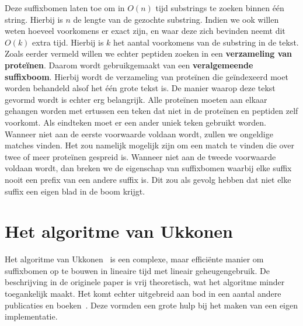 Deze suffixbomen laten toe om in $O(n)$ tijd substrings te zoeken binnen één string.
Hierbij is $n$ de lengte van de gezochte substring.
Indien we ook willen weten hoeveel voorkomens er exact zijn, en waar deze zich bevinden neemt dit $O(k)$ extra tijd.
Hierbij is $k$ het aantal voorkomens van de substring in de tekst.
Zoals eerder vermeld willen we echter peptiden zoeken in een \textbf{verzameling van proteïnen}.
Daarom wordt gebruikgemaakt van een \textbf{veralgemeende suffixboom}.
Hierbij wordt de verzameling van proteïnen die geïndexeerd moet worden behandeld alsof het één grote tekst is.
De manier waarop deze tekst gevormd wordt is echter erg belangrijk.
Alle proteïnen moeten aan elkaar gehangen worden met ertussen een teken dat niet in de proteïnen en peptiden zelf voorkomt.
Als eindteken moet er een ander uniek teken gebruikt worden.
Wanneer niet aan de eerste voorwaarde voldaan wordt, zullen we ongeldige matches vinden.
Het zou namelijk mogelijk zijn om een match te vinden die over twee of meer proteïnen gespreid is.
Wanneer niet aan de tweede voorwaarde voldaan wordt, dan breken we de eigenschap van suffixbomen waarbij elke suffix nooit een prefix van een andere suffix is.
Dit zou als gevolg hebben dat niet elke suffix een eigen blad in de boom krijgt.

\section{Het algoritme van Ukkonen}\label{sec:Ukkonen}
Het algoritme van Ukkonen~\cite{Ukkonen1995} is een complexe, maar efficiënte manier om suffixbomen op te bouwen in lineaire tijd met lineair geheugengebruik.
De beschrijving in de originele paper is vrij theoretisch, wat het algoritme minder toegankelijk maakt.
Het komt echter uitgebreid aan bod in een aantal andere publicaties en boeken~\cite{Gusfield1997, AD3_ukkonen, CCB_course, Ukkonen_CCB}.
Deze vormden een grote hulp bij het maken van een eigen implementatie.

